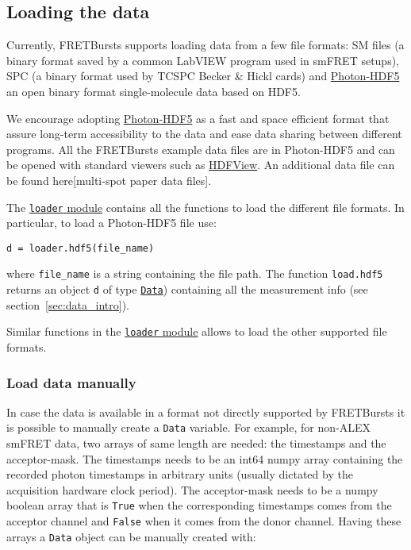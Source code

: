 \subsection{Loading the data}
Currently, FRETBursts supports loading data from a few file formats: SM files (a binary format saved by a common LabVIEW program used in smFRET setups), SPC (a binary format used by TCSPC Becker \& Hickl cards) and \href{http://photon-hdf5.readthedocs.org/}{Photon-HDF5}  an open binary format single-molecule data based on HDF5.

We encourage adopting \href{http://photon-hdf5.readthedocs.org/}{Photon-HDF5} as a fast and space efficient format that assure long-term accessibility to the data and ease data sharing between different programs. All the FRETBursts example data files are in Photon-HDF5 and can be opened with standard viewers such as \href{http://www.hdfgroup.org/products/java/hdfview/}{HDFView}. An additional data file can be found here[multi-spot paper data files].

The \href{http://fretbursts.readthedocs.org/en/latest/loader.html}{\texttt{loader} module}
contains all the functions to load the different file formats. In particular, to load a Photon-HDF5 file use:

\begin{verbatim}
d = loader.hdf5(file_name)
\end{verbatim}

where \verb|file_name| is a string containing the file path. The function \verb|load.hdf5| returns an object \verb|d| of type \href{http://fretbursts.readthedocs.org/en/latest/data_class.html}{\texttt{Data}}) containing all the measurement info (see section~\ref{sec:data_intro}).

Similar functions in the \href{http://fretbursts.readthedocs.org/en/latest/loader.html}{\texttt{loader} module} allows to load the other supported file formats.

\subsubsection{Load data manually}

In case the data is available in a format not directly supported by FRETBursts it is possible to manually create a \verb|Data| variable. For example, for non-ALEX smFRET data, two arrays of same length are needed: the timestamps and the acceptor-mask. The timestamps needs to be an int64 numpy array containing the recorded photon timestamps in arbitrary units (usually dictated by the acquisition hardware clock period). The acceptor-mask needs to be a numpy boolean array that is \verb|True| when the corresponding timestamps comes from the acceptor channel and \verb|False| when it comes from the donor channel. Having these arrays a \verb|Data| object can be manually created with:

